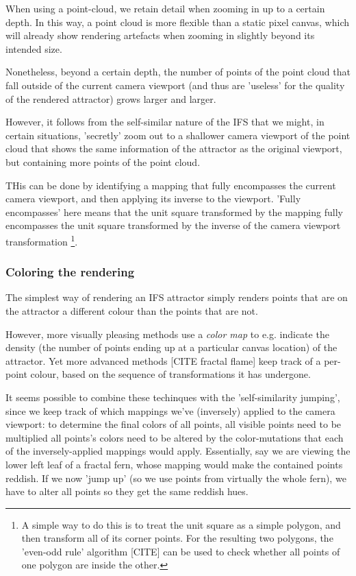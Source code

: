 \documentclass[11pt]{article}
\begin{document}
When using a point-cloud, we retain detail when zooming in up to a certain depth. In this way, a point cloud is more flexible than a 
static pixel canvas, which will already show rendering artefacts when zooming in slightly beyond its intended size.

Nonetheless, beyond a certain depth, the number of points of the point cloud that fall outside of the current camera viewport
(and thus are 'useless' for the quality of the rendered attractor) grows larger and larger.

However, it follows from the self-similar nature of the IFS that we might, in certain situations,
'secretly' zoom out to a shallower camera viewport of the point cloud that shows the same information of the attractor
as the original viewport, but containing more points of the point cloud.

THis can be done by identifying a mapping that fully encompasses the current camera viewport, and then applying its inverse
to the viewport.
'Fully encompasses' here means that the unit square transformed by the mapping fully encompasses
the unit square transformed by the inverse of the camera viewport transformation \footnote{A simple way to do this is to treat the unit square as a simple polygon,
and then transform all of its corner points. For the resulting two polygons, the 'even-odd rule' algorithm
[CITE]
can be used to check whether all points of one polygon are inside the other.}.


\subsubsection{Coloring the rendering}
\label{sec:orgf2ddce1}
\label{subsection:coloring}

The simplest way of rendering an IFS attractor simply renders points that are on the attractor a different colour
than the points that are not.

However, more visually pleasing methods use a \emph{color map} to e.g. indicate the density (the number of points ending up at a particular canvas location) of the attractor.
Yet more advanced methods [CITE fractal flame] keep track of a per-point colour, based on the sequence of transformations it has undergone.

It seems possible to combine these techinques with the 'self-similarity jumping', since we keep track of which mappings we've (inversely) applied to the camera viewport:
to determine the final colors of all points, all visible points need to be multiplied 
all points's colors need to be altered by the color-mutations that each of the inversely-applied mappings would apply.
Essentially, say we are viewing the lower left leaf of a fractal fern, whose mapping would make the contained points reddish. 
If we now 'jump up' (so we use points from virtually the whole fern), we have to alter all points so they get the same reddish hues.
\end{document}
